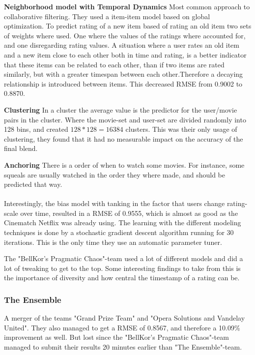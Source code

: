 \textbf{Neighborhood model with Temporal Dynamics}  Most common approach to collaborative filtering. They used a item-item model based on global optimization. To predict rating of a new item based of rating an old item two sets of weights where used. One where the values of the ratings where accounted for, and one disregarding rating values.
A situation where a user rates an old item and a new item close to each other both in time and rating, is a better indicator that these items can be related to each other, than if two items are rated similarly, but with a greater timespan between each other.Therefore a decaying relationship is introduced between items. This decreased RMSE from 0.9002 to 0.8870.\cite{BellKor-CF-TD}

\textbf{Clustering}  In a cluster the average value is the predictor for the user/movie pairs in the cluster. Where the movie-set and user-set are divided randomly into 128 bins, and created $128*128=16384$ clusters. This was their only usage of clustering, they found that it had no measurable impact on the accuracy of the final blend\cite{pragmatictheory-sol}.

\textbf{Anchoring}  There is a order of when to watch some movies. For instance, some squeals are usually watched in the order they where made, and should be predicted that way. \\\\


Interestingly, the bias model with tanking in the factor that users change rating-scale over time, resulted in a RMSE of 0.9555, which is almost as good as the Cinematch Netflix was already using. The learning with the different modeling techniques is done by a stochastic gradient descent algorithm running for 30 iterations. This is the only time they use an automatic parameter tuner. \cite{BellKor-2008-sol}

The "BellKor's Pragmatic Chaos"-team used a lot of different models and did a lot of tweaking to get to the top. Some interesting findings to take from this is the importance of diversity and how central the timestamp of a rating can be.

\subsubsection{The Ensemble}

A merger of the teams "Grand Prize Team" and "Opera Solutions and Vandelay United". They also managed to get a RMSE of 0.8567, and therefore a 10.09\% improvement as well. But lost since the "BellKor's Pragmatic Chaos"-team managed to submit their results 20 minutes earlier than "The Ensemble"-team.

